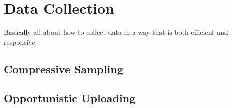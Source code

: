\section{Data Collection}\label{datacollection}

Basically all about how to collect data in a way that is both efficient and responsive

\subsection{Compressive Sampling}\label{compressivesampling} 


\subsection{Opportunistic Uploading}\label{opportunisticuploading}

